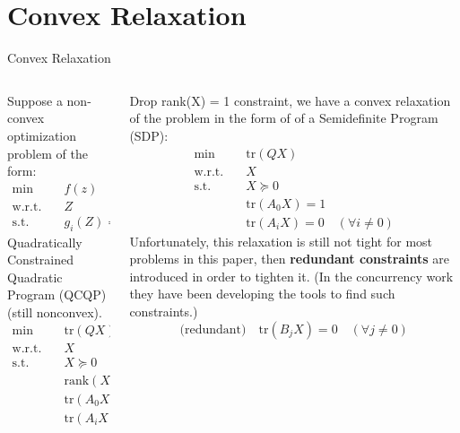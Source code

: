 \documentclass[8pt]{beamer}
\begin{document}
\section{Convex Relaxation}
\begin{frame}{Convex Relaxation}
\begin{columns}[T]
\begin{column}{0.48\textwidth}
Suppose a non-convex optimization problem of the form:
\begin{equation}
\begin{aligned}
\min \quad & f(z) \\
\text{w.r.t.} \quad & Z \\
\text{s.t.} \quad & g_i(Z) = 0 \quad \forall i
\end{aligned}
\end{equation}
Quadratically Constrained Quadratic Program (QCQP) (still nonconvex).
\begin{equation}
\begin{aligned}
\text{min} \quad & \text{tr}(QX) \\
\text{w.r.t.} \quad & X \\
\text{s.t.} \quad & X \succeq 0 \\
& \text{rank}(X) = 1 \\
& \text{tr}(A_0 X) = 1 \\
& \text{tr}(A_i X) = 0 \quad (\forall i \neq 0)
\end{aligned}
\end{equation}
\end{column}


\begin{column}{0.48\textwidth}
Drop rank(X) = 1 constraint, we have a convex relaxation of the problem in the form of of a Semidefinite Program (SDP):
\begin{equation}
\begin{aligned}
\text{min} \quad & \text{tr}(QX) \\
\text{w.r.t.} \quad & X \\
\text{s.t.} \quad & X \succeq 0 \\
& \text{tr}(A_0 X) = 1 \\
& \text{tr}(A_i X) = 0 \quad (\forall i \neq 0)
\end{aligned}
\end{equation}
Unfortunately, this relaxation is still not tight for most problems in this paper, then \textbf{redundant constraints} are introduced in order to tighten it. (In the concurrency work they have been developing the tools to find such constraints.)
\begin{equation}
\text{(redundant)} \quad \text{tr}(B_j X) = 0 \quad (\forall j \neq 0)
\end{equation}
\end{column}
\end{columns}
\end{frame}
\end{document}
